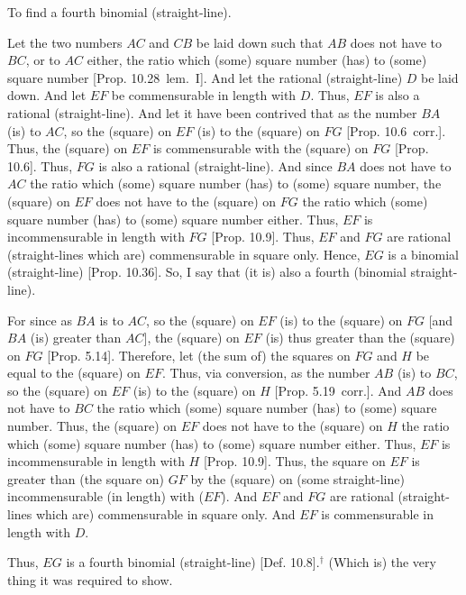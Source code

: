 \begin{Parallel}{}{}
{To find a fourth binomial (straight-line).

\epsfysize=1.2in
\centerline{}

Let the two numbers $AC$ and $CB$ be laid down such that $AB$ does not have to $BC$,  or to $AC$ either, the ratio which (some) square number
(has) to (some) square number [Prop. 10.28~lem.~I].
And let the rational (straight-line) $D$ be laid down. And let $EF$ be
commensurable in length with $D$. Thus, $EF$ is also a rational (straight-line). And let it have been contrived that as the number $BA$ (is) to
$AC$, so the (square) on $EF$ (is) to the (square) on $FG$ [Prop. 10.6~corr.]. Thus, the (square) on $EF$
is commensurable with the (square) on $FG$ [Prop. 10.6]. Thus, $FG$ is also a rational (straight-line). And since $BA$ does not have to $AC$ the ratio which (some)
square number (has) to (some) square number,  the (square) on $EF$
does not have to the (square) on $FG$ the ratio which (some) square number
(has) to (some) square number either. Thus, $EF$ is incommensurable in length with $FG$ [Prop. 10.9]. Thus, $EF$ and
$FG$ are rational (straight-lines which are) commensurable in square only.
Hence, $EG$ is a binomial (straight-line) [Prop. 10.36]. So, I say that (it is) also
a fourth (binomial straight-line).

For since as $BA$ is to $AC$, so the (square) on $EF$ (is) to the (square) on
$FG$ [and $BA$ (is) greater than $AC$], the (square) on $EF$ (is) thus
greater than the (square) on $FG$ [Prop. 5.14]. Therefore, let (the sum of) the squares on
$FG$ and $H$ be equal to the (square) on $EF$. Thus, via conversion,
as the number $AB$ (is) to $BC$, so the (square) on $EF$ (is) to the
(square) on $H$ [Prop. 5.19~corr.]. And $AB$
does not have to $BC$ the ratio which (some) square number (has) to (some)
square number. Thus, the (square) on $EF$ does not have to the
(square) on $H$ the ratio which (some) square number (has) to (some) square
number either. Thus, $EF$ is incommensurable in length with $H$ [Prop. 10.9]. Thus, the square on $EF$ is greater than (the square on) $GF$ by the (square) on (some straight-line)
incommensurable (in length) with ($EF$). And $EF$ and $FG$ are rational (straight-lines which are) commensurable in square only.  And $EF$ is commensurable
in length with $D$.

Thus, $EG$ is a fourth binomial (straight-line) [Def. 10.8].$^\dag$ (Which is) the very thing
it was required to show.}
\end{Parallel}



